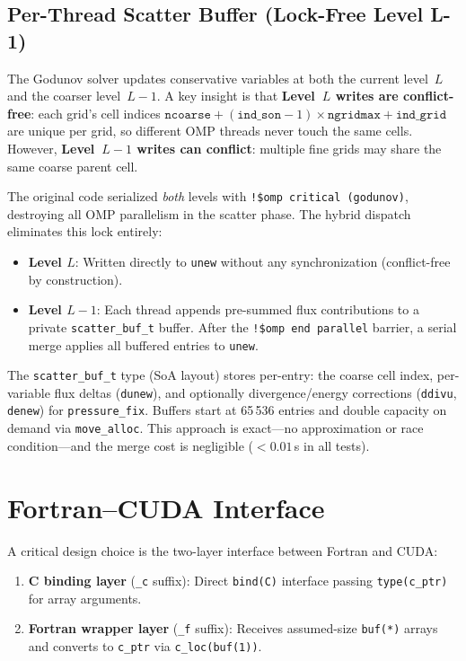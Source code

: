 \documentclass[11pt,fleqn]{book}
\begin{document}
\subsection{Per-Thread Scatter Buffer (Lock-Free Level L-1)}

The Godunov solver updates conservative variables at both the current level~$L$ and the coarser level~$L{-}1$.  A key insight is that \textbf{Level~$L$ writes are conflict-free}: each grid's cell indices $\texttt{ncoarse} + (\texttt{ind\_son}-1) \times \texttt{ngridmax} + \texttt{ind\_grid}$ are unique per grid, so different OMP threads never touch the same cells.  However, \textbf{Level~$L{-}1$ writes can conflict}: multiple fine grids may share the same coarse parent cell.

The original code serialized \emph{both} levels with \texttt{!\$omp critical (godunov)}, destroying all OMP parallelism in the scatter phase.  The hybrid dispatch eliminates this lock entirely:

\begin{itemize}[nosep]
\item \textbf{Level $L$}: Written directly to \texttt{unew} without any synchronization (conflict-free by construction).
\item \textbf{Level $L{-}1$}: Each thread appends pre-summed flux contributions to a private \texttt{scatter\_buf\_t} buffer.  After the \texttt{!\$omp end parallel} barrier, a serial merge applies all buffered entries to \texttt{unew}.
\end{itemize}

The \texttt{scatter\_buf\_t} type (SoA layout) stores per-entry: the coarse cell index, per-variable flux deltas (\texttt{dunew}), and optionally divergence/energy corrections (\texttt{ddivu}, \texttt{denew}) for \texttt{pressure\_fix}.  Buffers start at 65\,536 entries and double capacity on demand via \texttt{move\_alloc}.  This approach is exact---no approximation or race condition---and the merge cost is negligible ($< 0.01$\,s in all tests).

\section{Fortran--CUDA Interface}

A critical design choice is the two-layer interface between Fortran and CUDA:

\begin{enumerate}[nosep]
\item \textbf{C binding layer} (\texttt{\_c} suffix): Direct \texttt{bind(C)} interface passing \texttt{type(c\_ptr)} for array arguments.
\item \textbf{Fortran wrapper layer} (\texttt{\_f} suffix): Receives assumed-size \texttt{buf(*)} arrays and converts to \texttt{c\_ptr} via \texttt{c\_loc(buf(1))}.
\end{enumerate}
\end{document}
